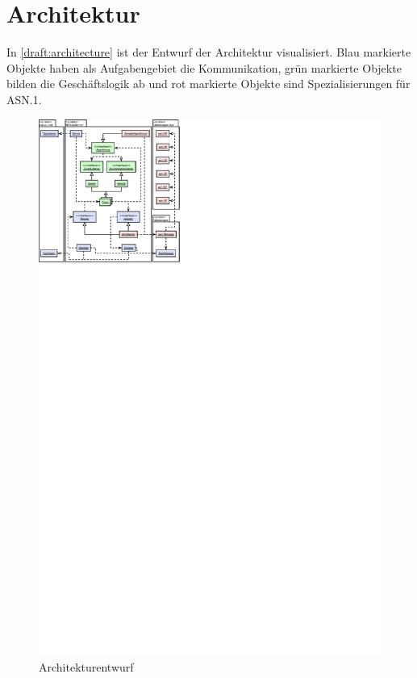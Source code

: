 

\section{Architektur}
		
In \autoref{draft:architecture} ist der Entwurf der Architektur visualisiert.
Blau markierte Objekte haben als Aufgabengebiet die Kommunikation, grün markierte Objekte bilden die Geschäftslogik ab und rot markierte Objekte sind Spezialisierungen für ASN.1.


\begin{figure}[H]
	\centering
	\includegraphics[width=2.0\textwidth]{dia/architecture}
	\caption{Architekturentwurf}
	\label{draft:architecture}
\end{figure}

